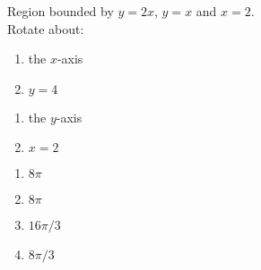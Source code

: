 {Region bounded by $y=2x$, $y=x$ and $x=2$.\\
Rotate about:\\
\begin{minipage}[t]{.5\linewidth}
\begin{enumerate}
\item		the $x$-axis
\item		$y=4$
\end{enumerate}
\end{minipage}%
\begin{minipage}[t]{.5\linewidth}
\begin{enumerate}\addtocounter{enumii}{2}
\item		the $y$-axis
\item		$x=2$
\end{enumerate}
\end{minipage}
}
{\begin{enumerate}
\item $8\pi$
\item $8\pi$
\item $16\pi/3$
\item $8\pi/3$
\end{enumerate}
}
